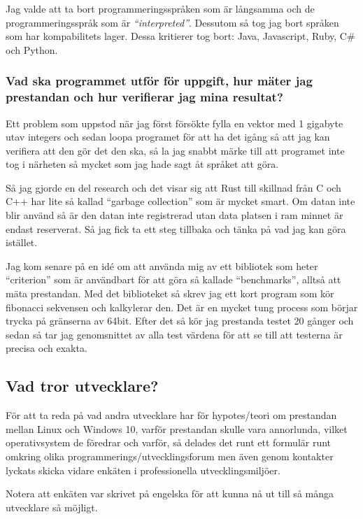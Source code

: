 \documentclass[12pt, a4paper]{report}
\begin{document}
Jag valde att ta bort programmeringsspråken som är långsamma och de programmeringsspråk som är \textit{``interpreted''}\cite{Interpreted-language}. Dessutom så tog jag bort språken som har kompabilitets lager. Dessa kritierer tog bort: Java, Javascript, Ruby, C\# och Python.

\subsubsection{Vad ska programmet utför för uppgift, hur mäter jag prestandan och hur verifierar jag mina resultat?}

Ett problem som uppstod när jag först försökte fylla en vektor med 1 gigabyte utav integers och sedan loopa programet för att ha det igång så att jag kan verifiera att den gör det den ska, så la jag snabbt märke till att programet inte tog i närheten så mycket som jag hade sagt åt språket att göra.

Så jag gjorde en del research och det visar sig att Rust till skillnad från C och C++ har lite så kallad ``garbage collection'' som är mycket smart. Om datan inte blir använd så är den datan inte registrerad utan data platsen i ram minnet är endast reserverat. Så jag fick ta ett steg tillbaka och tänka på vad jag kan göra istället.
 
Jag kom senare på en idé om att använda mig av ett bibliotek som heter ``criterion'' som är användbart för att göra så kallade ``benchmarks'', alltså att mäta prestandan. Med det biblioteket så skrev jag ett kort program som kör fibonacci sekvensen och kalkylerar den. Det är en mycket tung process som börjar trycka på gränserna av 64bit. Efter det så kör jag prestanda testet 20 gånger och sedan så tar jag genomsnittet av alla test värdena för att se till att testerna är precisa och exakta.
 
 
\subsection{Vad tror utvecklare?}
 
   För att ta reda på vad andra utvecklare har för hypotes/teori om prestandan mellan Linux och Windows 10, varför prestandan skulle vara annorlunda, vilket operativsystem de föredrar och varför, så delades det runt ett formulär runt omkring olika programmerings/utvecklingsforum men även genom kontakter lyckats skicka vidare enkäten i professionella utvecklingsmiljöer.
 
   Notera att enkäten var skrivet på engelska för att kunna nå ut till så många utvecklare så möjligt.
    
\end{document}
